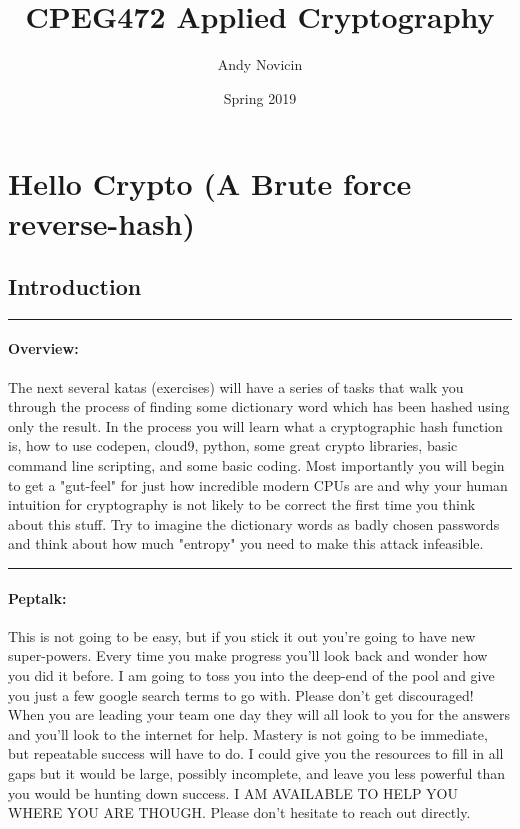 \documentclass[12pt]{article}
\newenvironment{overview}
  {\noindent\rule{\textwidth}{0.4pt}
  \paragraph{Overview:}
  }
  {\par
  \noindent\rule{\textwidth}{0.4pt}
  }
\begin{document}
\raggedbottom
\setlength{\parskip}{0pt}

\title{CPEG472 Applied Cryptography}
\author{Andy Novicin}
\date{Spring 2019}

\maketitle

\section{Hello Crypto (A Brute force reverse-hash)}

\subsection{Introduction}
\begin{overview}
The next several katas (exercises) will have a series of tasks that walk you through the process of finding some dictionary word which has been hashed using only the result. In the process you will learn what a cryptographic hash function is, how to use codepen, cloud9, python, some great crypto libraries, basic command line scripting, and some basic coding. Most importantly you will begin to get a "gut-feel" for just how incredible modern CPUs are and why your human intuition for cryptography is not likely to be correct the first time you think about this stuff. Try to imagine the dictionary words as badly chosen passwords and think about how much "entropy" you need to make this attack infeasible.
\end{overview}

\paragraph{Peptalk:}
 This is not going to be easy, but if you stick it out you're going to have new super-powers. Every time you make progress you'll look back and wonder how you did it before. I am going to toss you into the deep-end of the pool and give you just a few google search terms to go with. Please don't get discouraged! When you are leading your team one day they will all look to you for the answers and you'll look to the internet for help. Mastery is not going to be immediate, but repeatable success will have to do. I could give you the resources to fill in all gaps but it would be large, possibly incomplete, and leave you less powerful than you would be hunting down success. I AM AVAILABLE TO HELP YOU WHERE YOU ARE THOUGH. Please don't hesitate to reach out directly.
 \newpage
\end{document}
